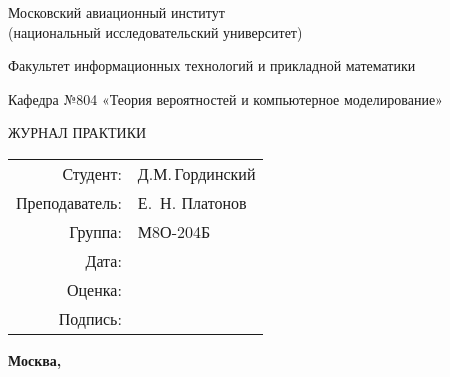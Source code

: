 \begin{titlepage}
\begin{center}
\bfseries

{\Large Московский авиационный институт\\ (национальный исследовательский университет)

}

\vspace{48pt}

Факультет информационных технологий и прикладной математики

\vspace{36pt}

Кафедра №804 «Теория вероятностей и компьютерное моделирование»

\vspace{48pt}

{\large ЖУРНАЛ ПРАКТИКИ 

}

\end{center}

\vspace{72pt}

\begin{flushright}
\begin{tabular}{rl}
Студент: & Д.М.\,Гординский\\
Преподаватель: & Е.\, Н. Платонов\\
Группа: & М8О-204Б \\
Дата: & \\
Оценка: & \\
Подпись: & \\
\end{tabular}
\end{flushright}

\vfill

\begin{center}
\bfseries
Москва, \the\year
\end{center}
\end{titlepage}

\pagebreak
